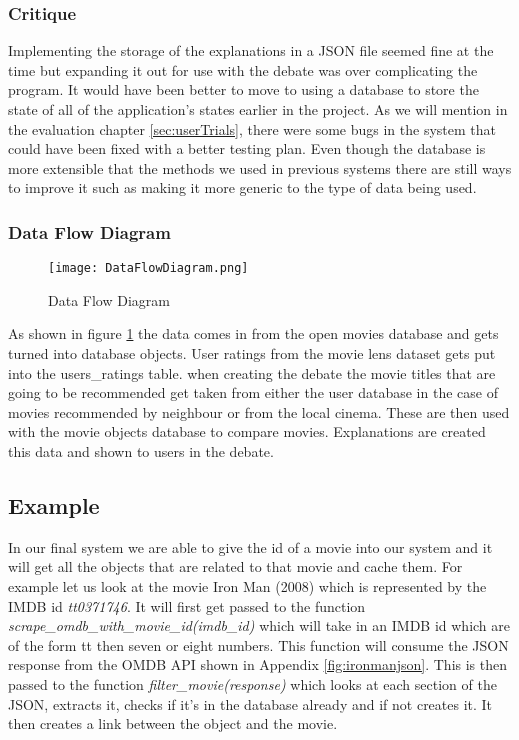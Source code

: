                     \subsubsection{Critique}
                        Implementing the storage of the explanations in a JSON file seemed fine at the time but expanding it out for use with the debate was over complicating the program. It would have been better to move to using a database to store the state of all of the application's states earlier in the project.
                        As we will mention in the evaluation chapter \ref{sec:userTrials}, there were some bugs in the system that could have been fixed with a better testing plan. Even though the database is more extensible that the methods we used in previous systems there are still ways to improve it such as making it more generic to the type of data being used. 



            \subsubsection{Data Flow Diagram}
            \begin{figure}
                \texttt{[image: DataFlowDiagram.png]}
                \caption{Data Flow Diagram}
                \label{fig:DataFlowDiagram}
            \end{figure}
            
            As shown in figure \ref{fig:DataFlowDiagram} the data comes in from the open movies database and gets turned into database objects. User ratings from the movie lens dataset gets put into the users\_ratings table. when creating the debate the movie titles that are going to be recommended get taken from either the user database in the case of movies recommended by neighbour or from the local cinema. These are then used with the movie objects database to compare movies. Explanations are created this data and shown to users in the debate. 


            \subsection{Example}
                In our final system we are able to give the id of a movie into our system and it will get all the objects that are related to that movie and cache them. For example let us look at the movie Iron Man (2008) which is represented by the IMDB id \textit{tt0371746}. It will first get passed to the function \textit{scrape\_omdb\_with\_movie\_id(imdb\_id)}  which will take in an IMDB id which are of the form tt then seven or eight numbers. This function will consume the JSON response from the OMDB API shown in Appendix \ref{fig:ironmanjson}. This is then passed to the function \textit{filter\_movie(response)} which looks at each section of the JSON, extracts it, checks if it's in the database already and if not creates it. It then creates a link between the object and the movie. 
                

